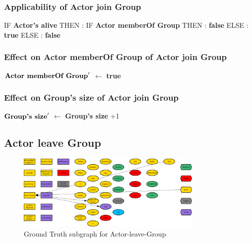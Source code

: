 \documentclass{article}%
\begin{document}
\subsubsection{Applicability of Actor join Group}%
\label{ssubsec:Applicability of Actor join Group}%
\begin{flushleft}%
IF %
\textbf{Actor's alive}%
\linebreak%
\hspace*{2em}%
THEN %
: %
IF %
\textbf{Actor memberOf Group}%
\linebreak%
\hspace*{4em}%
THEN %
: %
\textbf{false}%
\linebreak%
\hspace*{4em}%
ELSE %
: %
\textbf{true}%
\linebreak%
\hspace*{2em}%
ELSE %
: %
\textbf{false}%
\end{flushleft}

%
\subsubsection{Effect on Actor memberOf Group of Actor join Group}%
\label{ssubsec:Effect on Actor memberOf Group of Actor join Group}%
\begin{flushleft}%
$\mbox{\textbf{Actor memberOf Group}} '$%
$\leftarrow$%
\textbf{true}%
\end{flushleft}

%
\subsubsection{Effect on Group's size of Actor join Group}%
\label{ssubsec:Effect on Group's size of Actor join Group}%
\begin{flushleft}%
$\mbox{\textbf{Group's size}} '$%
$\leftarrow$%
\textbf{Group's size}%
+1%
\end{flushleft}

%
\subsection{Actor leave Group}%
\label{subsec:Actor leave Group}%


\begin{figure}[ht]%
\centering%
\includegraphics[width=0.8\textwidth]{images/Actor-leave-Group.png}%
\caption{Ground Truth subgraph for Actor{-}leave{-}Group}%
\end{figure}
\end{document}
